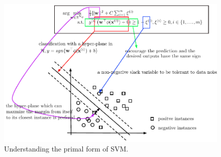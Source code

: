 \begin{figure}[t]
	\includegraphics[width=\textwidth]{./Figures/SVM_prime}	
	\caption{Understanding the primal form of SVM.}
	\label{fig:SVM}
\end{figure}


